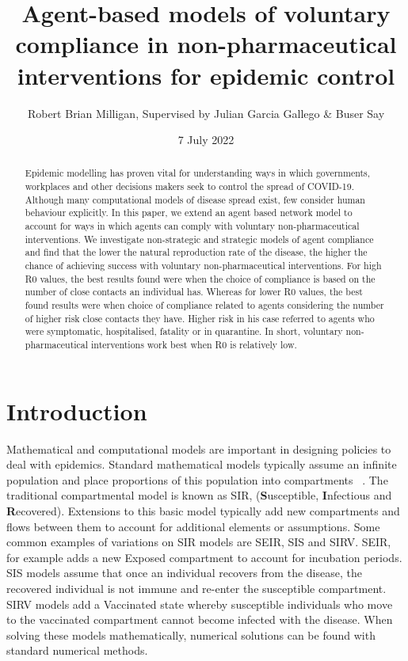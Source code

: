 \documentclass{article}
\title{Agent-based models of voluntary compliance in non-pharmaceutical interventions for epidemic control}
\author{Robert Brian Milligan, Supervised by Julian Garcia Gallego \& Buser Say}
\date{7 July 2022}
\begin{document}
\maketitle

\begin{abstract}
Epidemic modelling has proven vital for understanding ways in which governments, workplaces and other decisions makers seek to control the spread of COVID-19. Although many computational models of disease spread exist, few consider human behaviour explicitly. In this paper, we extend an agent based network model to account for ways in which agents can comply with voluntary non-pharmaceutical interventions. We investigate non-strategic and strategic models of agent compliance and find that the lower the natural reproduction rate of the disease, the higher the chance of achieving success with voluntary non-pharmaceutical interventions. For high R0 values, the best results found were when the choice of compliance is based on the number of close contacts an individual has. Whereas for lower R0 values, the best found results were when choice of compliance related to agents considering the number of higher risk close contacts they have. Higher risk in his case referred to agents who were symptomatic, hospitalised, fatality or in quarantine. In short, voluntary non-pharmaceutical interventions work best when R0 is relatively low.
\end{abstract}




\newpage 

\tableofcontents

\newpage 

\section{Introduction}

Mathematical and computational models are important in designing policies to deal with epidemics. 
Standard mathematical models typically assume an infinite population and place proportions of this population into compartments ~\cite{cooper_mondal_antonopoulos_2020}. 
The traditional compartmental model is known as SIR, ({\bf S}usceptible, {\bf I}nfectious and {\bf R}ecovered). 
Extensions to this basic model typically add new compartments and flows between them to account for additional elements or assumptions. 
Some common examples of variations on SIR models are SEIR, SIS and SIRV. 
SEIR, for example adds a new Exposed compartment to account for incubation periods. 
SIS models assume that once an individual recovers from the disease, the recovered individual is not immune and re-enter the susceptible compartment.
SIRV models add a Vaccinated state whereby susceptible individuals who move to the vaccinated compartment cannot become infected with the disease.
When solving these models mathematically, numerical solutions can be found with standard numerical methods. \newline
\end{document}
